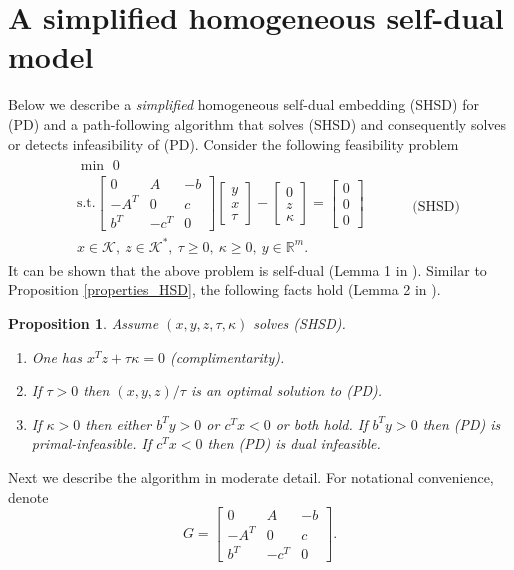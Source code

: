 \documentclass[11pt]{article}
\theoremstyle{definition}
\theoremstyle{plain}
\newtheorem{prop}{Proposition}
\begin{document}
\section{A simplified homogeneous self-dual model}
Below we describe a \textit{simplified} homogeneous self-dual embedding (SHSD) for (PD) and a path-following algorithm that solves (SHSD) and consequently solves or detects infeasibility of (PD). Consider the following feasibility problem
\begin{align*}
\begin{split}
& \min \,\, 0 \\
& \text{s.t.} \begin{bmatrix}
0 & A & -b \\ 
-A^T & 0 & c \\
b^T & -c^T& 0 
\end{bmatrix}
\begin{bmatrix}
y \\ x \\ \tau
\end{bmatrix} - 
\begin{bmatrix}
0 \\ z \\ \kappa 
\end{bmatrix} = 
\begin{bmatrix}
0 \\ 0 \\ 0
\end{bmatrix}\\
& x \in \mathcal{K},\ z \in \mathcal{K}^*,\ \tau \geq 0,\ \kappa\geq 0,\ y \in \mathbb{R}^m.
\end{split} \quad \quad \quad \text{(SHSD)}
\end{align*}
It can be shown that the above problem is self-dual (Lemma 1 in \cite{Skarjaa_and_Ye}). Similar to Proposition \ref{properties_HSD}, the following facts hold (Lemma 2 in \cite{Skarjaa_and_Ye}).
\begin{prop}\label{properties_SHSD}
Assume $(x,y,z,\tau,\kappa)$ solves (SHSD).
\begin{enumerate}
		\item One has $x^T z + \tau\kappa = 0$ (complimentarity).
		\item If $\tau>0$ then $(x,y,z)/\tau$ is an optimal solution to (PD). 
		\item If $\kappa>0$ then either $b^Ty>0$ or $c^Tx<0$ or both hold. 
		\subitem If $b^T y>0$ then (PD) is primal-infeasible.
		\subitem If $c^T x < 0$ then (PD) is dual infeasible.
	\end{enumerate}
\end{prop}
Next we describe the algorithm in moderate detail. For notational convenience, denote 
\[G = \begin{bmatrix}
0 & A & -b \\ 
-A^T & 0 & c \\
b^T & -c^T& 0 
\end{bmatrix}.\]
\end{document}
